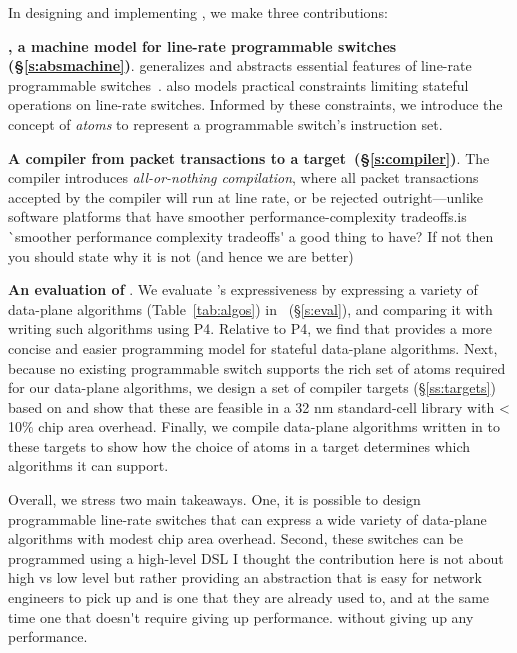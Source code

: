 In designing and implementing \pktlanguage, we make three contributions:
\begin{CompactEnumerate}
\item \textbf{\absmachine, a machine model for line-rate programmable switches
  (\S\ref{s:absmachine})}.  \absmachine generalizes and abstracts
  essential features of line-rate programmable switches~\cite{rmt, xpliant,
  flexpipe}. \absmachine also models practical constraints limiting stateful
  operations on line-rate switches.  Informed by these constraints, we
  introduce the concept of {\em atoms} to represent a programmable switch's
  instruction set.

\item \textbf{A compiler from \pktlanguage packet transactions to
  a \absmachine target~(\S\ref{s:compiler})}. The \pktlanguage compiler
  introduces \textit{all-or-nothing compilation}, where all packet transactions
  accepted by the compiler will run at line rate, or be rejected
  outright---unlike software platforms that have smoother
  performance-complexity tradeoffs.\ac{is `smoother performance complexity tradeoffs'
  a good thing to have? If not then you should state why it is not (and hence we 
  are better)}

\item \textbf{An evaluation of \pktlanguage}. We evaluate \pktlanguage's
  expressiveness by expressing a variety of data-plane algorithms (Table~\ref{tab:algos})
  in \pktlanguage~(\S\ref{s:eval}), and comparing it with writing such  
  algorithms using P4.  Relative to P4, we find that \pktlanguage provides a more
  concise and easier programming model for stateful data-plane algorithms.
  Next, because no existing programmable switch supports the rich set of atoms
  required for our data-plane algorithms, we design a set of compiler targets
  (\S\ref{ss:targets}) based on \absmachine and show that these are feasible in
  a 32 nm standard-cell library with < 10\% chip area overhead.  Finally, we
  compile data-plane algorithms written in \pktlanguage to these targets to
  show how the choice of atoms in a target determines which algorithms it can
  support.
\end{CompactEnumerate}

Overall, we stress two main takeaways. One, it is possible to design
programmable line-rate switches that can express a wide variety of data-plane
algorithms with modest chip area overhead. Second, these switches can be
programmed using a high-level DSL \ac{I thought the contribution here is not about high vs
low level but rather providing an abstraction that is easy for network engineers to 
pick up and is one that they are already used to, and at the same time one that doesn't
require giving up performance.}
without giving up any performance.
